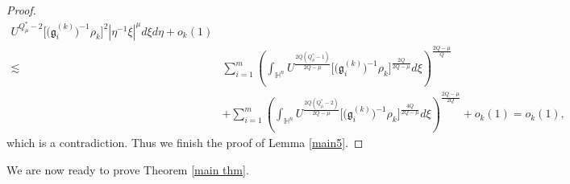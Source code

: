 \documentclass[11pt]{article}
\begin{document}
\begin{proof}
\begin{align}
{U^{Q^{\ast}_{\mu}-2}\Big[\Big(\mathfrak{g}_i^{(k)}\Big)^{-1}\rho_k\Big]^2}{|\eta^{-1}\xi|^{\mu}}{d}\xi d\eta+o_k(1)  \nonumber\\
\lesssim& \sum\limits_{i=1}^m \left(\int_{\mathbb{H}^{n}}
U^{\frac{2Q(Q^{\ast}_{\mu}-1)}{2Q-\mu}} \Big[\Big(\mathfrak{g}_i^{(k)}\Big)^{-1}\rho_k\Big]^{\frac{2Q}{2Q-\mu}} d\xi\right )^{\frac{2Q-\mu}{Q}}  \nonumber\\
&+\sum\limits_{i=1}^m \left(\int_{\mathbb{H}^{n}}
U^{\frac{2Q(Q^{\ast}_{\mu}-2)}{2Q-\mu}} \Big[\Big(\mathfrak{g}_i^{(k)}\Big)^{-1}\rho_k\Big]^{\frac{4Q}{2Q-\mu}} d\xi\right )^{\frac{2Q-\mu}{2Q}}+o_k(1)=o_k(1),
\end{align}
which is a contradiction.
Thus we finish the proof of Lemma \ref{main5}.
\end{proof}

We are now ready to prove Theorem \ref{main thm}.
\end{document}
